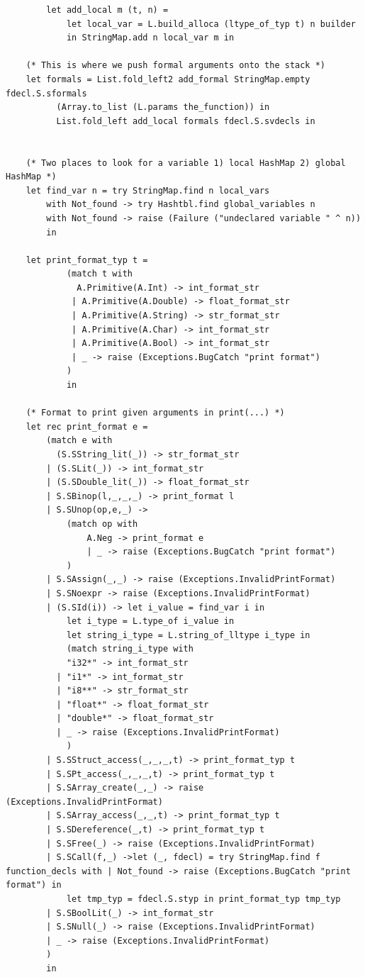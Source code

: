 \documentclass{article}
\begin{document}
\begin{lstlisting}
		let add_local m (t, n) =
        	let local_var = L.build_alloca (ltype_of_typ t) n builder
        	in StringMap.add n local_var m in

	(* This is where we push formal arguments onto the stack *)
	let formals = List.fold_left2 add_formal StringMap.empty fdecl.S.sformals
          (Array.to_list (L.params the_function)) in
          List.fold_left add_local formals fdecl.S.svdecls in


	(* Two places to look for a variable 1) local HashMap 2) global HashMap *)
	let find_var n = try StringMap.find n local_vars
		with Not_found -> try Hashtbl.find global_variables n
		with Not_found -> raise (Failure ("undeclared variable " ^ n))
		in

	let print_format_typ t =
			(match t with 
			  A.Primitive(A.Int) -> int_format_str
			 | A.Primitive(A.Double) -> float_format_str
			 | A.Primitive(A.String) -> str_format_str
			 | A.Primitive(A.Char) -> int_format_str
			 | A.Primitive(A.Bool) -> int_format_str
			 | _ -> raise (Exceptions.BugCatch "print format") 
			)
			in

	(* Format to print given arguments in print(...) *)
	let rec print_format e =
		(match e with 
		  (S.SString_lit(_)) -> str_format_str
		| (S.SLit(_)) -> int_format_str
		| (S.SDouble_lit(_)) -> float_format_str
		| S.SBinop(l,_,_,_) -> print_format l
		| S.SUnop(op,e,_) -> 
			(match op with
				A.Neg -> print_format e
				| _ -> raise (Exceptions.BugCatch "print format")
			)
		| S.SAssign(_,_) -> raise (Exceptions.InvalidPrintFormat) 
		| S.SNoexpr -> raise (Exceptions.InvalidPrintFormat) 
		| (S.SId(i)) -> let i_value = find_var i in 
			let i_type = L.type_of i_value in 
			let string_i_type = L.string_of_lltype i_type in 
			(match string_i_type with 
		    "i32*" -> int_format_str 
		  | "i1*" -> int_format_str 
		  | "i8**" -> str_format_str
		  | "float*" -> float_format_str
		  | "double*" -> float_format_str
		  | _ -> raise (Exceptions.InvalidPrintFormat)
			)		
		| S.SStruct_access(_,_,_,t) -> print_format_typ t
		| S.SPt_access(_,_,_,t) -> print_format_typ t
		| S.SArray_create(_,_) -> raise (Exceptions.InvalidPrintFormat) 
		| S.SArray_access(_,_,t) -> print_format_typ t
		| S.SDereference(_,t) -> print_format_typ t
		| S.SFree(_) -> raise (Exceptions.InvalidPrintFormat) 
		| S.SCall(f,_) ->let (_, fdecl) = try StringMap.find f function_decls with | Not_found -> raise (Exceptions.BugCatch "print format") in 
			let tmp_typ = fdecl.S.styp in print_format_typ tmp_typ	
		| S.SBoolLit(_) -> int_format_str
		| S.SNull(_) -> raise (Exceptions.InvalidPrintFormat) 
		| _ -> raise (Exceptions.InvalidPrintFormat) 
		)
		in


\end{lstlisting}
\end{document}
